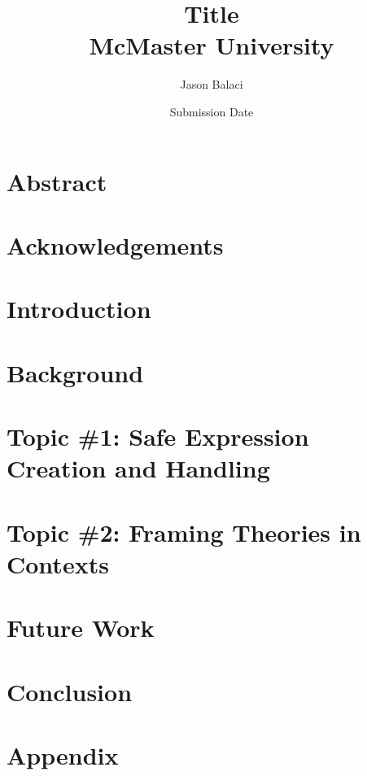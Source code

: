 \documentclass[12pt]{report}
\title{
    {Title}\\
    {McMaster University}
}
\author{Jason Balaci}
\date{Submission Date}
\begin{document}
    \todototoc
    \listoftodos

    \maketitle

    \chapter*{Abstract}
    

    \chapter*{Acknowledgements}
    

    \tableofcontents

    \chapter{Introduction}
    

    \chapter{Background}
    
    
    \chapter{Topic \#1: Safe Expression Creation and Handling}
    
    
    \chapter{Topic \#2: Framing Theories in Contexts}
    


    \chapter{Future Work}
    
    
    \chapter{Conclusion}
    

    \appendix
    \chapter{Appendix}
    

\end{document}
